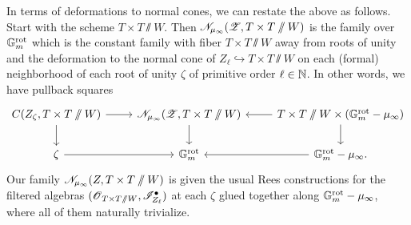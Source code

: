 In terms of deformations to normal cones, we can restate the above as follows. Start with the scheme $T \times T\sslash W$. Then $\mathscr{N}_{\mu_{\infty}}(\operatorname{\mathscr{Z}}, T \times T \sslash W)$ is the family over $\mathbb{G}_m^{\mathrm{rot}}$ which is the constant family with fiber $T \times T\sslash W$ away from roots of unity and the deformation to the normal cone of $Z_{\ell} \hookrightarrow T \times T\sslash W$ on each (formal) neighborhood of each root of unity $\zeta$ of primitive order $\ell \in \operatorname{\mathbb{N}}$. In other words, we have pullback squares
\begin{equation*}
    \begin{tikzcd}
      C(Z_{\zeta}, T \times T \sslash W) \arrow[d] \arrow[r]&  \eN_{\mu_{\infty}}(\eZ, T \times T \sslash W) \arrow[d] & \arrow[l] \arrow[d] T \times T \sslash W \times (\Gm^{\rot} - \mu_{\infty}) \\
      \zeta \arrow[r] & \Gm^{\rot} & \arrow[l] \Gm^{\rot} - \mu_{\infty}. 
    \end{tikzcd}
\end{equation*}
Our family $\mathscr{N}_{\mu_{\infty}}(Z, T \times T \sslash W)$ is given the usual Rees constructions for the filtered algebras $(\operatorname{\mathscr{O}}_{T \times T \sslash W}, \mathscr{I}^{\bullet}_{Z_{\ell}})$ at each $\zeta$ glued together along $\mathbb{G}_m^{\mathrm{rot}} - \mu_{\infty}$, where all of them naturally trivialize.





